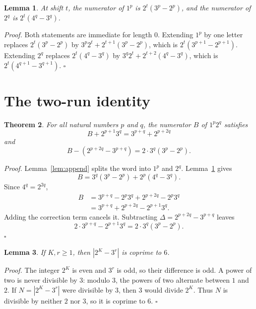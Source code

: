 \documentclass[11pt,letterpaper]{article}
\newtheorem{theorem}{Theorem}
\newtheorem{lemma}[theorem]{Lemma}
\newenvironment{proof}{\noindent\textit{Proof.}}{\hfill\(\square\)}
\begin{document}
\begin{lemma}
\label{lem:blocks}
At shift \(t\), the numerator of \(1^p\) is \(2^t(3^p-2^p)\), and the numerator of \(2^q\) is \(2^t(4^q-3^q)\).
\end{lemma}

\begin{proof}
Both statements are immediate for length \(0\). Extending \(1^p\) by one letter replaces \(2^t(3^p-2^p)\) by \(3^p2^t+2^{t+1}(3^p-2^p)\), which is \(2^t(3^{p+1}-2^{p+1})\). Extending \(2^q\) replaces \(2^t(4^q-3^q)\) by \(3^q2^t+2^{t+2}(4^q-3^q)\), which is \(2^t(4^{q+1}-3^{q+1})\).
\end{proof}

\section{The two-run identity}

\begin{theorem}
\label{thm:closed}
For all natural numbers \(p\) and \(q\), the numerator \(B\) of \(1^p2^q\) satisfies
\[
B+2^{p+1}3^q=3^{p+q}+2^{p+2q}
\]
and
\[
B-(2^{p+2q}-3^{p+q})=2\cdot 3^q(3^p-2^p).
\]
\end{theorem}

\begin{proof}
Lemma~\ref{lem:append} splits the word into \(1^p\) and \(2^q\). Lemma~\ref{lem:blocks} gives
\[
B=3^q(3^p-2^p)+2^p(4^q-3^q).
\]
Since \(4^q=2^{2q}\),
\begin{align*}
B
&=3^{p+q}-2^p3^q+2^{p+2q}-2^p3^q\\
&=3^{p+q}+2^{p+2q}-2^{p+1}3^q.
\end{align*}
Adding the correction term cancels it. Subtracting \(\Delta=2^{p+2q}-3^{p+q}\) leaves
\[
2\cdot 3^{p+q}-2^{p+1}3^q=2\cdot 3^q(3^p-2^p).
\]
\end{proof}

\begin{lemma}
\label{lem:coprime}
If \(K,r\ge 1\), then \(|2^K-3^r|\) is coprime to \(6\).
\end{lemma}

\begin{proof}
The integer \(2^K\) is even and \(3^r\) is odd, so their difference is odd. A power of two is never divisible by \(3\): modulo \(3\), the powers of two alternate between \(1\) and \(2\). If \(N=|2^K-3^r|\) were divisible by \(3\), then \(3\) would divide \(2^K\). Thus \(N\) is divisible by neither \(2\) nor \(3\), so it is coprime to \(6\).
\end{proof}
\end{document}
